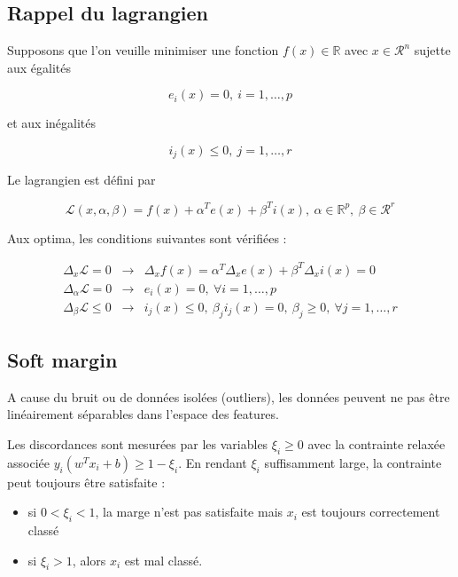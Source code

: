 	\subsection{Rappel du lagrangien}
	
	Supposons que l'on veuille minimiser une fonction $f(x) \in \mathbb{R}$ avec $x \in \mathcal{R}^n$ sujette aux égalités
	
	$$e_i(x) = 0, \: i = 1, \dots , p$$
	
	et aux inégalités
	
	$$i_j(x) \leq 0, \: j = 1, \dots , r$$
	
	Le lagrangien est défini par
	
	$$\mathcal{L}(x, \alpha, \beta) = f(x) + \alpha^T e(x) + \beta^T i(x), \: \alpha \in \mathbb{R}^p, \: \beta \in \mathcal{R}^r$$
	
	Aux optima, les conditions suivantes sont vérifiées :
	
	\begin{eqnarray*}
	\Delta_x \mathcal{L} = 0 & \rightarrow & \Delta_x f(x) = \alpha^T \Delta_x e(x) + \beta^T \Delta_x i(x) = 0 \\
	\Delta_{\alpha} \mathcal{L} = 0 & \rightarrow & e_i(x) = 0, \: \forall i = 1, \dots , p \\
	\Delta_\beta \mathcal{L} \leq 0 & \rightarrow & i_j(x) \leq 0, \: \beta_j i_j(x) = 0, \: \beta_j \geq 0, \: \forall j = 1, \dots , r
	\end{eqnarray*}
		
	\subsection{Soft margin}
	
	A cause du bruit ou de données isolées (outliers), les données peuvent ne pas être linéairement séparables dans l'espace des features. 
	
	
	Les discordances sont mesurées par les variables $\xi_i \geq 0$ avec la contrainte relaxée associée $y_i(w^Tx_i + b) \geq 1 - \xi_i$. En rendant $\xi_i$ suffisamment large, la contrainte peut toujours être satisfaite :
	
	\begin{itemize}
		\item si $0 < \xi_i < 1$, la marge n'est pas satisfaite mais $x_i$ est toujours correctement classé
		\item si $\xi_i > 1$, alors $x_i$ est mal classé.
	\end{itemize}
	
